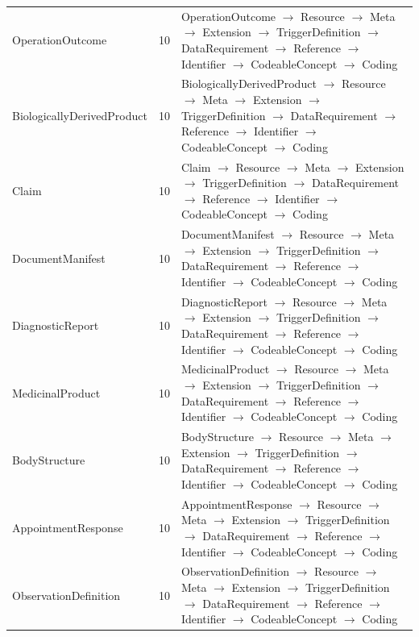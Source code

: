 \begin{longtable}{lrl}
OperationOutcome & 10 & OperationOutcome $\rightarrow$ Resource $\rightarrow$ Meta $\rightarrow$ Extension $\rightarrow$ TriggerDefinition $\rightarrow$ DataRequirement $\rightarrow$ Reference $\rightarrow$ Identifier $\rightarrow$ CodeableConcept $\rightarrow$ Coding \\
BiologicallyDerivedProduct & 10 & BiologicallyDerivedProduct $\rightarrow$ Resource $\rightarrow$ Meta $\rightarrow$ Extension $\rightarrow$ TriggerDefinition $\rightarrow$ DataRequirement $\rightarrow$ Reference $\rightarrow$ Identifier $\rightarrow$ CodeableConcept $\rightarrow$ Coding \\
Claim & 10 & Claim $\rightarrow$ Resource $\rightarrow$ Meta $\rightarrow$ Extension $\rightarrow$ TriggerDefinition $\rightarrow$ DataRequirement $\rightarrow$ Reference $\rightarrow$ Identifier $\rightarrow$ CodeableConcept $\rightarrow$ Coding \\
DocumentManifest & 10 & DocumentManifest $\rightarrow$ Resource $\rightarrow$ Meta $\rightarrow$ Extension $\rightarrow$ TriggerDefinition $\rightarrow$ DataRequirement $\rightarrow$ Reference $\rightarrow$ Identifier $\rightarrow$ CodeableConcept $\rightarrow$ Coding \\
DiagnosticReport & 10 & DiagnosticReport $\rightarrow$ Resource $\rightarrow$ Meta $\rightarrow$ Extension $\rightarrow$ TriggerDefinition $\rightarrow$ DataRequirement $\rightarrow$ Reference $\rightarrow$ Identifier $\rightarrow$ CodeableConcept $\rightarrow$ Coding \\
MedicinalProduct & 10 & MedicinalProduct $\rightarrow$ Resource $\rightarrow$ Meta $\rightarrow$ Extension $\rightarrow$ TriggerDefinition $\rightarrow$ DataRequirement $\rightarrow$ Reference $\rightarrow$ Identifier $\rightarrow$ CodeableConcept $\rightarrow$ Coding \\
BodyStructure & 10 & BodyStructure $\rightarrow$ Resource $\rightarrow$ Meta $\rightarrow$ Extension $\rightarrow$ TriggerDefinition $\rightarrow$ DataRequirement $\rightarrow$ Reference $\rightarrow$ Identifier $\rightarrow$ CodeableConcept $\rightarrow$ Coding \\
AppointmentResponse & 10 & AppointmentResponse $\rightarrow$ Resource $\rightarrow$ Meta $\rightarrow$ Extension $\rightarrow$ TriggerDefinition $\rightarrow$ DataRequirement $\rightarrow$ Reference $\rightarrow$ Identifier $\rightarrow$ CodeableConcept $\rightarrow$ Coding \\
ObservationDefinition & 10 & ObservationDefinition $\rightarrow$ Resource $\rightarrow$ Meta $\rightarrow$ Extension $\rightarrow$ TriggerDefinition $\rightarrow$ DataRequirement $\rightarrow$ Reference $\rightarrow$ Identifier $\rightarrow$ CodeableConcept $\rightarrow$ Coding \\

\end{longtable}
